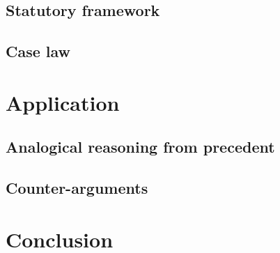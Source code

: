 \documentclass[11pt,a4paper]{article}
\begin{document}
\subsection{Statutory framework}

\subsection{Case law}

\section{Application}
\label{sec:application}

\subsection{Analogical reasoning from precedent}

\subsection{Counter-arguments}

\section{Conclusion}
\label{sec:conclusion}

\end{document}
